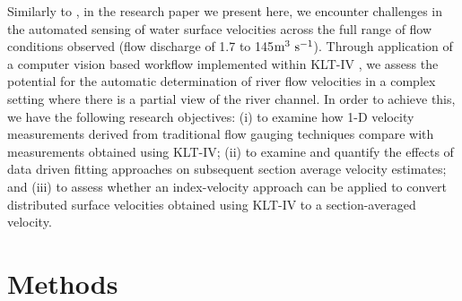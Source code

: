 \documentclass[hess, manuscript]{copernicus} %
\begin{document}
Similarly to \citet{Hutley2023}, in the research paper we present here, we encounter challenges in the automated sensing of water surface velocities across the full range of flow conditions observed (flow discharge of 1.7 to 145$\textnormal{m\textsuperscript{3} s\textsuperscript{-1}}$). Through application of a computer vision based workflow implemented within KLT-IV \citep{Perks2020a}, we assess the potential for the automatic determination of river flow velocities in a complex setting where there is a partial view of the river channel. In order to achieve this, we have the following research objectives: (i) to examine how 1-D velocity measurements derived from traditional flow gauging techniques compare with measurements obtained using KLT-IV; (ii) to examine and quantify the effects of data driven fitting approaches on subsequent section average velocity estimates; and (iii) to assess whether an index-velocity approach can be applied to convert distributed surface velocities obtained using KLT-IV to a section-averaged velocity.

\section{Methods}
\end{document}
